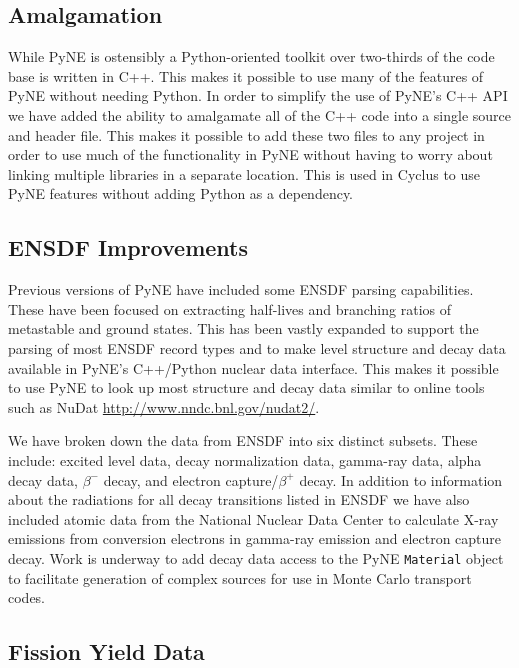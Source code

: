 \documentclass{anstrans}
\begin{document}
\subsection{Amalgamation}

While PyNE is ostensibly a Python-oriented toolkit over two-thirds 
of the code base is written in C++. This makes it possible to use many 
of the features of PyNE without needing Python. In order to simplify 
the use of PyNE's C++ API we have added the ability to amalgamate all 
of the C++ code into a single source and header file. This makes it 
possible to add these two files to any project in order to use much of the 
functionality in PyNE without having to worry about linking multiple 
libraries in a separate location. This is used in Cyclus 
\cite{carlsen_cyclus_2014} to use PyNE features without adding Python as
 a dependency.

\subsection{ENSDF Improvements}

Previous versions of PyNE have included some ENSDF parsing capabilities. 
These have been focused on extracting half-lives and branching ratios of 
metastable and ground states. This has been vastly expanded to support the 
parsing of most ENSDF record types and to make level structure and decay data 
available in PyNE's C++/Python nuclear data interface. This makes it possible 
to use PyNE to look up most structure and decay data similar to online tools
such as NuDat \url{http://www.nndc.bnl.gov/nudat2/}. 

We have broken down the data from ENSDF into six distinct subsets. These 
include: excited level data, decay normalization data, gamma-ray data, alpha 
decay data, $\beta^-$ decay, and electron capture/$\beta^+$ decay. In addition 
to information about the radiations for all decay transitions listed in ENSDF we 
have also included atomic data from the National Nuclear Data Center to calculate 
X-ray emissions from 
conversion electrons in gamma-ray emission and electron capture decay.
Work is underway to add decay data access to the PyNE \texttt{Material} object to
facilitate generation of complex sources for use in Monte Carlo transport codes. 

\subsection{Fission Yield Data}
\end{document}
